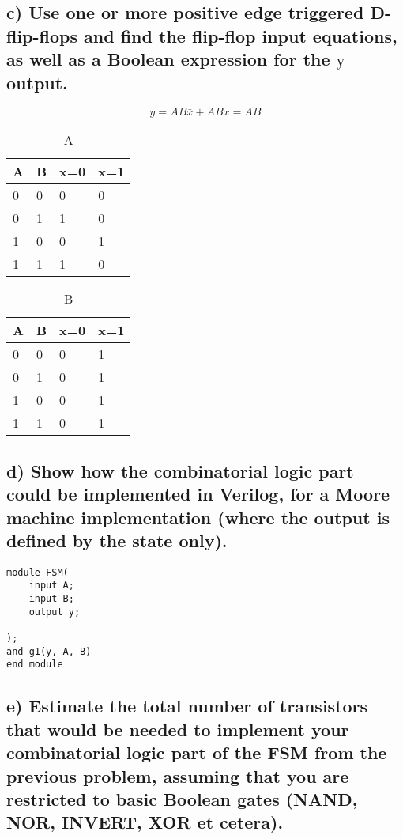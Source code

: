 \subsection*{c) Use one or more positive edge triggered D-flip-flops and find the flip-flop input equations, as well as a Boolean expression for the $\mathrm{y}$ output.}

$$y=AB\bar{x}+ABx=AB$$

\begin{table}[H]
\centering
\caption{A}
\begin{tabular}{llll}
    \hline
    A&B&x=0&x=1\\
    \hline
    0&0&0&0\\
    0&1&1&0\\
    1&0&0&1\\
    1&1&1&0\\
    \hline
\end{tabular}
\end{table}

\begin{table}[H]
    \centering
    \caption{B}
    \begin{tabular}{llll}
        \hline
        A&B&x=0&x=1\\
        \hline
        0&0&0&1\\
        0&1&0&1\\
        1&0&0&1\\
        1&1&0&1\\
        \hline
    \end{tabular}
    \end{table}

\subsection*{d) Show how the combinatorial logic part could be implemented in Verilog, for a Moore machine implementation (where the output is defined by the state only).}
\begin{lstlisting}
module FSM(
    input A;
    input B;
    output y;

);
and g1(y, A, B)
end module
\end{lstlisting}

\subsection*{e) Estimate the total number of transistors that would be needed to implement your combinatorial logic part of the FSM from the previous problem, assuming that you are 
restricted to basic Boolean gates (NAND, NOR, INVERT, XOR et cetera).}

